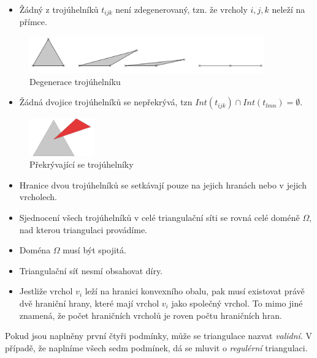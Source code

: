 \documentclass[12pt,a4paper]{article}
\begin{document}
\begin{itemize}
\item Žádný z trojúhelníků $t_{ijk}$ není zdegenerovaný, tzn. že vrcholy $i, j, k$ neleží na přímce.
\end{itemize}
\begin{figure}[h!]
\centering
\includegraphics[width=0.9\textwidth]{img/podm_1.png}
\caption{Degenerace trojúhelníku}
\label{fig:podm_1}
\end{figure}
\begin{itemize}
\item Žádná dvojice trojúhelníků se nepřekrývá, tzn $Int(t_{ijk}) \cap Int(t_{lmn}) = \emptyset$.
\end{itemize}
\begin{figure}[h!]
\centering
\includegraphics[width=0.25\textwidth]{img/podm_2.png}
\caption{Překrývající se trojúhelníky}
\label{fig:podm_2}
\end{figure}
\begin{itemize}
\item Hranice dvou trojúhelníků se setkávají pouze na jejich hranách nebo v jejich vrcholech.

\item Sjednocení všech trojúhelníků v celé triangulační síti se rovná celé doméně $\Omega$, nad kterou triangulaci provádíme.

\item Doména $\Omega$ musí být spojitá.

\item Triangulační síť nesmí obsahovat díry.

\item Jestliže vrchol $v_i$ leží na hranici konvexního obalu, pak musí existovat právě dvě hraniční hrany, které mají vrchol $v_i$ jako společný vrchol. To mimo jiné znamená, že počet hraničních vrcholů je roven počtu hraničních hran.
\end{itemize}
\bigskip
Pokud jsou naplněny první čtyři podmínky, může se triangulace nazvat \emph{validní}. V případě, že naplníme všech sedm podmínek, dá se mluvit o \emph{regulérní} triangulaci.
\end{document}
